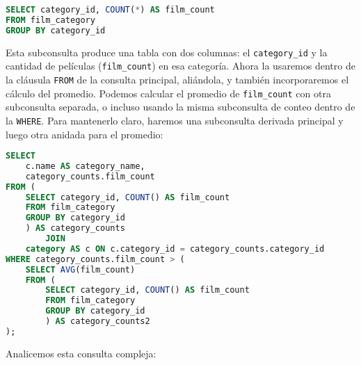 \documentclass[12pt,a4paper]{article}
\begin{document}
\begin{lstlisting}[language=SQL]
SELECT category_id, COUNT(*) AS film_count
FROM film_category
GROUP BY category_id
\end{lstlisting}


Esta subconsulta produce una tabla con dos columnas: el \texttt{category\_id} y la cantidad de películas (\texttt{film\_count}) en esa categoría.
%
Ahora la usaremos dentro de la cláusula \texttt{FROM} de la consulta principal, aliándola, y también incorporaremos el cálculo del promedio.
%
Podemos calcular el promedio de \texttt{film\_count} con otra subconsulta separada, o incluso usando la misma subconsulta de conteo dentro de la \texttt{WHERE}.
%
Para mantenerlo claro, haremos una subconsulta derivada principal y luego otra anidada para el promedio: 


\begin{lstlisting}[language=SQL]
SELECT 
	c.name AS category_name, 
	category_counts.film_count
FROM (
	SELECT category_id, COUNT() AS film_count
	FROM film_category
	GROUP BY category_id
	) AS category_counts
		JOIN 
	category AS c ON c.category_id = category_counts.category_id
WHERE category_counts.film_count > (
	SELECT AVG(film_count)
	FROM (
		SELECT category_id, COUNT() AS film_count
		FROM film_category
		GROUP BY category_id
		) AS category_counts2
);
\end{lstlisting}


Analicemos esta consulta compleja:
\end{document}
